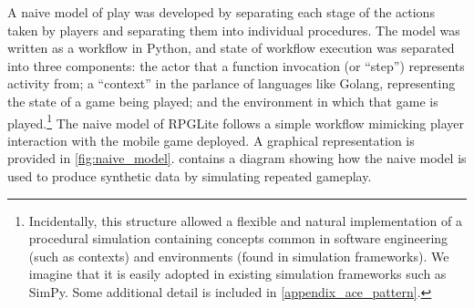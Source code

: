 A naive model of play was developed by separating each stage of the actions
taken by players and separating them into individual procedures. The model was
written as a workflow in Python, and state of workflow execution was separated
into three components: the actor that a function invocation (or ``step'')
represents activity from; a ``context'' in the parlance of languages like
Golang, representing the state of a game being played; and the environment in
which that game is played.\footnote{Incidentally, this structure allowed a
flexible and natural implementation of a procedural simulation containing
concepts common in software engineering (such as contexts) and environments
(found in simulation frameworks). We imagine that it is easily adopted in
existing simulation frameworks such as SimPy\cite{simpy_intro}. Some additional
detail is included in \cref{appendix_ace_pattern}.} The naive model of RPGLite
follows a simple workflow mimicking player interaction with the mobile game
deployed. A graphical representation is provided in \cref{fig:naive_model}.
 contains a diagram showing
how the naive model is used to produce synthetic data by simulating repeated
gameplay.

